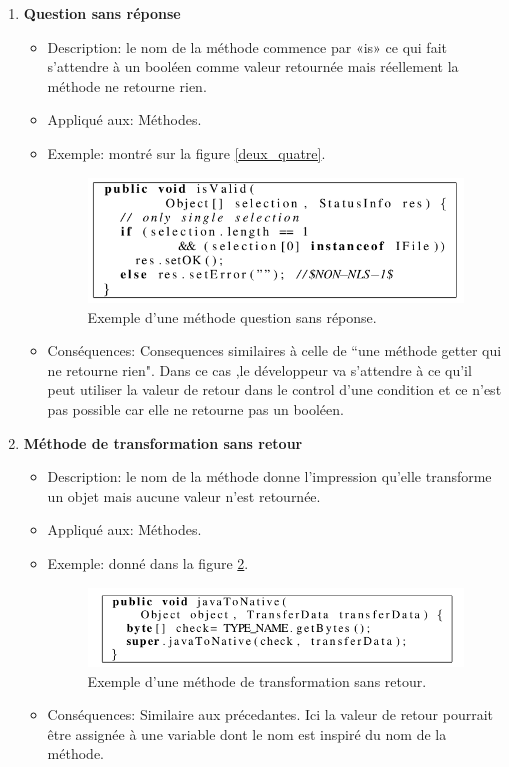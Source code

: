 \begin{enumerate}
\item \textbf {Question sans réponse}
\begin{itemize}
\item Description: le nom de la méthode commence par «is» ce qui fait s'attendre à un booléen comme valeur retournée mais réellement la méthode ne retourne rien.
\item Appliqué aux: Méthodes.
\item Exemple: montré sur la figure \ref{deux_quatre}.
\begin{figure}[H]
	\centering
\includegraphics[width=0.9\linewidth]{Others/Resources/deux_quatre.png}
	\caption{Exemple d'une méthode question sans réponse\cite{arnaoudova2013new}.}
		\label{fig:deux_quatre}
	\end{figure}
\item Conséquences: Consequences similaires à celle de “une méthode getter qui ne retourne rien". Dans ce cas ,le développeur va s’attendre à ce qu’il peut utiliser la valeur de retour dans le control d’une condition et ce n’est pas possible car elle ne retourne pas un booléen.
\end{itemize}

\item \textbf {Méthode de transformation sans retour}
\begin{itemize}
\item Description: le nom de la méthode donne l’impression qu’elle transforme un objet mais aucune valeur n’est retournée.
\item Appliqué aux: Méthodes.
\item Exemple: donné dans la figure \ref{fig:deux_cinq}.
\begin{figure}[H]
	\centering
\includegraphics[width=0.9\linewidth]{Others/Resources/deux_cinq.png}
	\caption{Exemple d'une méthode de transformation sans retour\cite{arnaoudova2013new}.}
		\label{fig:deux_cinq}
	\end{figure}
\item Conséquences: Similaire aux précedantes. Ici la valeur de retour pourrait être assignée à une variable dont le nom est inspiré du nom de la méthode.
\end{itemize}


\end{enumerate}
